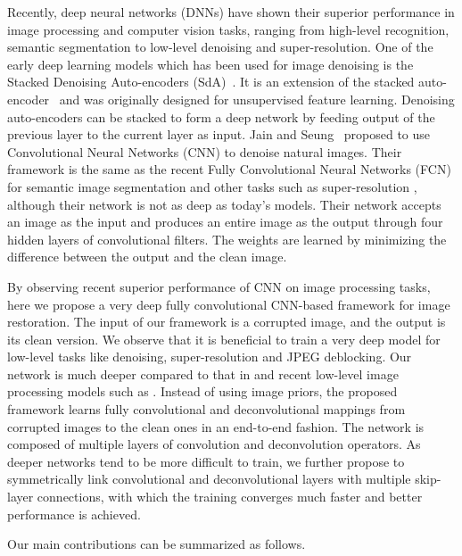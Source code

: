     Recently, deep neural networks (DNNs) have shown their superior performance in image processing
and computer vision tasks, ranging from high-level recognition, semantic segmentation to low-level
denoising and super-resolution. One of the early deep learning models which has been used for image
denoising is the Stacked Denoising Auto-encoders (SdA)~\cite{DBLP:conf/icml/VincentLBM08}. It is
an extension of the stacked auto-encoder~\cite{DBLP:conf/nips/BengioLPL06} and was originally designed
for unsupervised feature learning.  Denoising auto-encoders can be stacked to form a deep network
by feeding output of the previous layer to the current layer as input. Jain and Seung~\cite{DBLP:conf/nips/JainS08}
proposed to use Convolutional Neural Networks (CNN) to denoise natural images. Their framework is
the same as the recent Fully Convolutional Neural Networks (FCN) for semantic image segmentation \cite{DBLP:conf/cvpr/LongSD15}
and other tasks such as super-resolution \cite{DBLP:journals/pami/DongLHT16}, although their network
is not as deep as today's models. Their network accepts an image as the input and produces an
entire image as the output through four hidden layers of convolutional filters.
The weights are learned by
minimizing the difference between the output and the clean image.



By observing recent superior performance of CNN on image processing tasks, here we propose a very deep fully convolutional
CNN-based framework for image restoration. The input of our framework is a corrupted image, and
the output is its clean version.  We observe that it is beneficial to train a very deep model for
low-level tasks like denoising, super-resolution and JPEG deblocking. Our network is much
deeper compared to that in \cite{DBLP:conf/nips/JainS08} and recent low-level image processing models
such as \cite{DBLP:journals/pami/DongLHT16}.  Instead of using image priors, the proposed framework
learns  fully convolutional and deconvolutional mappings from corrupted images to the clean
ones in an end-to-end fashion. The network is composed of multiple layers of convolution and deconvolution operators.
As deeper networks tend to be more difficult to train, we further propose to symmetrically link convolutional
and deconvolutional layers with multiple skip-layer connections, with which the training converges much faster
and better performance is achieved.

%




Our main contributions can be summarized as follows.

